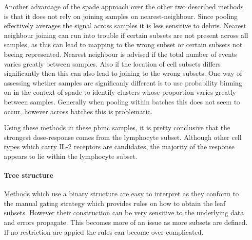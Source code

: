 Another advantage of the spade approach over the other two described methods is that it does not rely on joining samples on nearest-neighbour.
Since pooling effectively averages the signal across samples it is less sensitive to debris.
Nearest neighbour joining can run into trouble if certain subsets are not present across all samples, as this can lead to mapping to the wrong subset
or certain subsets not beeing represented.
Nearest neighbour is advised if the total number of events varies greatly between samples.
Also if the location of cell subsets differs significantly then this can also lead to joining to the wrong subsets.
One way of assessing whether samples are significanly different is to use probability binning on in the context of spade to identify clusters whose proportion
varies greatly between samples.  Generally when pooling within batches this does not seem to occur, however across batches this is problematic. 


Using these methods in these pbmc samples, it is pretty conclusive that the strongest dose-response comes from the lymphocyte subset.
Although other cell types which carry IL-2 receptors are candidates, the majority of the response appears to lie within the lymphocyte subset.



\paragraph{Tree structure}

Methods which use a binary structure are easy to interpret as they conform to the manual gating strategy
which provides rules on how to obtain the leaf subsets.
However their construction can be very sensitive to the underlying data and errors propagate.
This becomes more of an issue as more subsets are defined. 
If no restriction are appied the rules can become over-complicated.






